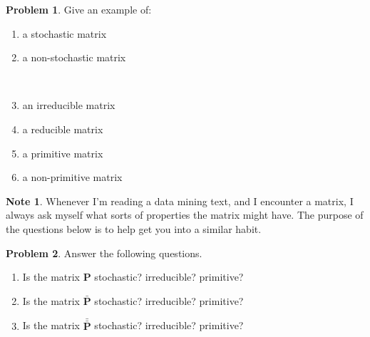 \documentclass[10pt]{article}
\theoremstyle{definition}
\newtheorem{problem}{Problem}
\newtheorem{note}{Note}
\newcommand{\p}{\mathbf P}
\newcommand{\pb}{\bar {\p}}
\newcommand{\pbb}{\bar {\pb}}
\begin{document}
\begin{problem}
    Give an example of:
    \begin{enumerate}
        \item a stochastic matrix
            \vspace{3in}
        \item a non-stochastic matrix
            \vspace{3in}

            ~
            \newpage
        \item an irreducible matrix
            \vspace{4in}
        \item a reducible matrix
            \vspace{4in}
            \newpage
        \item a primitive matrix
            \vspace{4in}
        \item a non-primitive matrix
    \end{enumerate}
\end{problem}

\newpage
\begin{note}
Whenever I'm reading a data mining text,
and I encounter a matrix,
    I always ask myself what sorts of properties the matrix might have.
The purpose of the questions below is to help get you into a similar habit.
\end{note}
\begin{problem}
    Answer the following questions.
    \begin{enumerate}
        \item 
            Is the matrix $\p$ stochastic? irreducible? primitive?
            \vspace{3in}
        \item 
            Is the matrix $\pb$ stochastic? irreducible? primitive?
            \vspace{3in}
        \item 
            Is the matrix $\pbb$ stochastic? irreducible? primitive?
            \vspace{3in}
    \end{enumerate}
\end{problem}

\newpage
\end{document}

